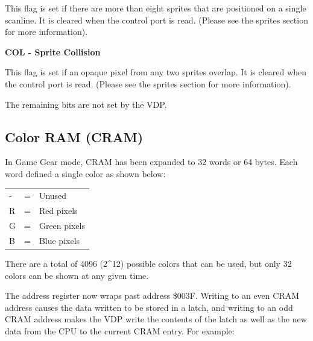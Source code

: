 \documentclass{article}
\begin{document}
This flag is set if there are more than eight sprites that are positioned on a
single scanline. It is cleared when the control port is read.  (Please see the
sprites section for more information).

\textbf{COL - Sprite Collision}

This flag is set if an opaque pixel from any two sprites overlap. It is cleared
when the control port is read. (Please see the sprites section for more
information).

The remaining bits are not set by the VDP.

\subsection{Color RAM (CRAM)}

In Game Gear mode, CRAM has been expanded to 32 words or 64 bytes. Each word
defined a single color as shown below:

\begin{table}[H]
    \centering
    \begin{tabular}{l c l}
        - & = & Unused          \\
        R & = & Red pixels      \\
        G & = & Green pixels    \\
        B & = & Blue pixels     \\
    \end{tabular}
\end{table}

There are a total of 4096 (2\^{}12) possible colors that can be used, but only
32 colors can be shown at any given time.

The address register now wraps past address \$003F. Writing to an even CRAM
address causes the data written to be stored in a latch, and writing to an odd
CRAM address makes the VDP write the contents of the latch as well as the new
data from the CPU to the current CRAM entry. For example:
\end{document}

